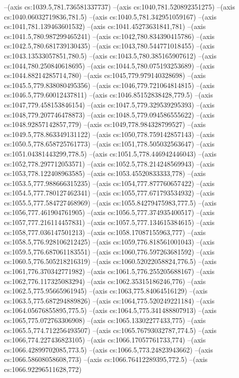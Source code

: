--(axis cs:1039.5,781.736581337737)
--(axis cs:1040,781.520892351275)
--(axis cs:1040.06032719836,781.5)
--(axis cs:1040.5,781.342951059167)
--(axis cs:1041,781.139463601532)
--(axis cs:1041.45273631841,781)
--(axis cs:1041.5,780.987299465241)
--(axis cs:1042,780.834390415786)
--(axis cs:1042.5,780.681739130435)
--(axis cs:1043,780.544771018455)
--(axis cs:1043.13533057851,780.5)
--(axis cs:1043.5,780.385165907612)
--(axis cs:1044,780.250840618695)
--(axis cs:1044.5,780.075193253689)
--(axis cs:1044.88214285714,780)
--(axis cs:1045,779.979140328698)
--(axis cs:1045.5,779.838080495356)
--(axis cs:1046,779.721064814815)
--(axis cs:1046.5,779.60012437811)
--(axis cs:1046.85152838428,779.5)
--(axis cs:1047,779.458153846154)
--(axis cs:1047.5,779.329539295393)
--(axis cs:1048,779.207746478873)
--(axis cs:1048.5,779.094586555622)
--(axis cs:1048.92857142857,779)
--(axis cs:1049,778.984328799527)
--(axis cs:1049.5,778.863349131122)
--(axis cs:1050,778.759142857143)
--(axis cs:1050.5,778.658725761773)
--(axis cs:1051,778.505032563647)
--(axis cs:1051.04381443299,778.5)
--(axis cs:1051.5,778.446942446043)
--(axis cs:1052,778.297712053571)
--(axis cs:1052.5,778.214248569943)
--(axis cs:1053,778.122408963585)
--(axis cs:1053.45520833333,778)
--(axis cs:1053.5,777.988666315235)
--(axis cs:1054,777.877760657422)
--(axis cs:1054.5,777.780127462341)
--(axis cs:1055,777.671793534932)
--(axis cs:1055.5,777.584727468969)
--(axis cs:1055.84279475983,777.5)
--(axis cs:1056,777.461904761905)
--(axis cs:1056.5,777.374935400517)
--(axis cs:1057,777.216114457831)
--(axis cs:1057.5,777.134615384615)
--(axis cs:1058,777.036147501213)
--(axis cs:1058.17087155963,777)
--(axis cs:1058.5,776.928106212425)
--(axis cs:1059,776.818561001043)
--(axis cs:1059.5,776.687061183551)
--(axis cs:1060,776.597263681592)
--(axis cs:1060.5,776.505218216319)
--(axis cs:1060.52022058824,776.5)
--(axis cs:1061,776.370342771982)
--(axis cs:1061.5,776.255205688167)
--(axis cs:1062,776.117325083294)
--(axis cs:1062.35315186246,776)
--(axis cs:1062.5,775.95665961945)
--(axis cs:1063,775.84064516129)
--(axis cs:1063.5,775.687294889826)
--(axis cs:1064,775.520249221184)
--(axis cs:1064.05676855895,775.5)
--(axis cs:1064.5,775.341488807913)
--(axis cs:1065,775.072763306908)
--(axis cs:1065.13302277433,775)
--(axis cs:1065.5,774.712256493507)
--(axis cs:1065.76793032787,774.5)
--(axis cs:1066,774.227436823105)
--(axis cs:1066.17057761733,774)
--(axis cs:1066.42899702085,773.5)
--(axis cs:1066.5,773.24823943662)
--(axis cs:1066.58608058608,773)
--(axis cs:1066.76412289395,772.5)
--(axis cs:1066.92296511628,772)
